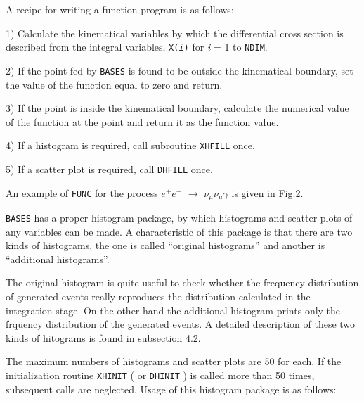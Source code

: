 \par\noindent
A recipe for writing a function program is as follows:
{\small\begin{description}
\item{1)} Calculate the kinematical variables by which the differential cross
section is described from the integral variables, {\tt X({\it i})} for {\it i}
= 1 to {\tt NDIM}.
\item{2)} If the point fed by {\tt BASES} is found to be outside the
kinematical boundary, set the value of the function equal to zero and return.
\item{3)} If the point is inside the kinematical boundary, calculate the
numerical value of the function at the point and return  it as the function value.
\item{4)} If a histogram is required, call subroutine {\tt XHFILL} once.
\item{5)} If a scatter plot is required, call {\tt DHFILL} once.
\end{description}}
\par\noindent
An example of {\tt FUNC} for the process $e^+e^-$ $\rightarrow$ $\nu_{\mu}
\bar{\nu}_{\mu} \gamma$ is given in Fig.2.
\par \bigskip  
{}   
\par\medskip 
{\tt BASES} has a proper histogram package, by which histograms and scatter plots of
any variables can be made.
A characteristic of this package is that there are two kinds of histograms, the
one is called ``original histograms'' and another is ``additional histograms''.
\par
The original histogram is quite useful to check whether the frequency
distribution of generated events really reproduces the distribution calculated in
the integration stage. 
On the other hand the additional histogram prints only the frquency distribution of
 the generated events. 
A detailed description of these two kinds of hitograms is found in subsection
4.2.
\par 
The maximum numbers of histograms and scatter plots are 50 for each.
If the initialization routine {\tt XHINIT} ( or {\tt DHINIT} ) is called more than 50
times, subsequent calls are neglected.
Usage of this histogram package  is as follows:
\par
